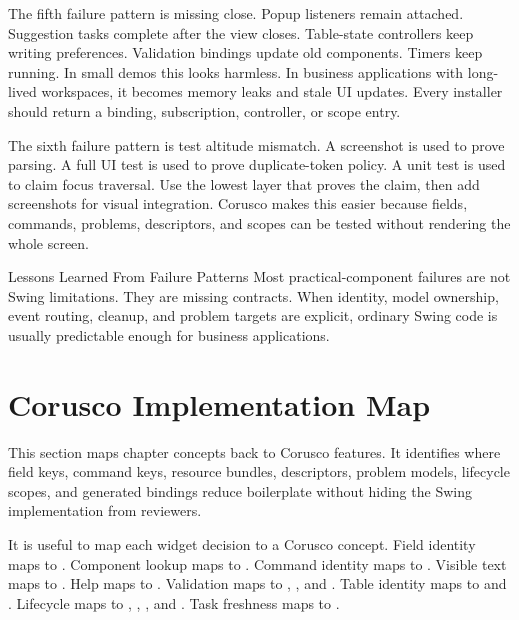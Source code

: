 The fifth failure pattern is missing close. Popup listeners remain attached.
Suggestion tasks complete after the view closes. Table-state controllers keep
writing preferences. Validation bindings update old components. Timers keep
running. In small demos this looks harmless. In business applications with
long-lived workspaces, it becomes memory leaks and stale UI updates. Every
installer should return a binding, subscription, controller, or scope entry.

The sixth failure pattern is test altitude mismatch. A screenshot is used to
prove parsing. A full UI test is used to prove duplicate-token policy. A unit
test is used to claim focus traversal. Use the lowest layer that proves the
claim, then add screenshots for visual integration. Corusco makes this easier
because fields, commands, problems, descriptors, and scopes can be tested
without rendering the whole screen.

\begin{principlebox}{Lessons Learned From Failure Patterns}
Most practical-component failures are not Swing limitations. They are missing
contracts. When identity, model ownership, event routing, cleanup, and problem
targets are explicit, ordinary Swing code is usually predictable enough for
business applications.
\end{principlebox}

\section{Corusco Implementation Map}

\begin{roadmapbox}
This section maps chapter concepts back to Corusco features. It identifies where
field keys, command keys, resource bundles, descriptors, problem models,
lifecycle scopes, and generated bindings reduce boilerplate without hiding the
Swing implementation from reviewers.
\end{roadmapbox}

It is useful to map each widget decision to a Corusco concept. Field identity
maps to . Component lookup maps to . Command
identity maps to . Visible text maps to .
Help maps to . Validation maps to ,
, and . Table identity maps to
 and . Lifecycle maps to ,
, , and . Task freshness
maps to .

